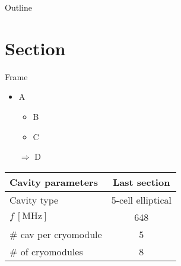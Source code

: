 


\usepackage[
   french,
   english,
]{babel} %
% 


\maketitle

\begin{frame}[noframenumbering]{Outline}
   \tableofcontents
\end{frame}

\section{Section}
\begin{frame}{Frame}
   \begin{itemize}
      \item A
            \begin{itemize}
               \item B
               \item C
            \end{itemize}
      \item[\( \Rightarrow \)] D
   \end{itemize}
   \begin{table}[hbtp]
      \centering
      \begin{tabular}{@{} l c @{}}
         \toprule
         Cavity parameters     & Last section      \\
         \midrule
         Cavity type           & 5-cell elliptical \\
         \( f\,[\si{\MHz}]\)   & \num{648}         \\
         \# cav per cryomodule & \num{5}           \\
         \# of cryomodules     & 8                 \\
         \bottomrule
      \end{tabular}
   \end{table}
\end{frame}





